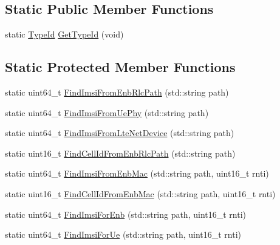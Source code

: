 \subsection*{Static Public Member Functions}
\begin{DoxyCompactItemize}
\item 
static \hyperlink{classns3_1_1TypeId}{Type\+Id} \hyperlink{classns3_1_1LteStatsCalculator_ab21178215156860d0f38cb3d1ae1991b}{Get\+Type\+Id} (void)
\end{DoxyCompactItemize}
\subsection*{Static Protected Member Functions}
\begin{DoxyCompactItemize}
\item 
static uint64\+\_\+t \hyperlink{classns3_1_1LteStatsCalculator_a1ed21b0ddc825f8d61a790083d098a76}{Find\+Imsi\+From\+Enb\+Rlc\+Path} (std\+::string path)
\item 
static uint64\+\_\+t \hyperlink{classns3_1_1LteStatsCalculator_a3b6ba2cfd900be948241a4838fb6a609}{Find\+Imsi\+From\+Ue\+Phy} (std\+::string path)
\item 
static uint64\+\_\+t \hyperlink{classns3_1_1LteStatsCalculator_a85843b5cea26f922818c1e3374a08e18}{Find\+Imsi\+From\+Lte\+Net\+Device} (std\+::string path)
\item 
static uint16\+\_\+t \hyperlink{classns3_1_1LteStatsCalculator_a5d4f64c0c48a8d0a841f0b889a11af2a}{Find\+Cell\+Id\+From\+Enb\+Rlc\+Path} (std\+::string path)
\item 
static uint64\+\_\+t \hyperlink{classns3_1_1LteStatsCalculator_a9cad885eb21450cedca3f94d6cf191d8}{Find\+Imsi\+From\+Enb\+Mac} (std\+::string path, uint16\+\_\+t rnti)
\item 
static uint16\+\_\+t \hyperlink{classns3_1_1LteStatsCalculator_a87a9bc9d89913c21ef67854abeaf2dd3}{Find\+Cell\+Id\+From\+Enb\+Mac} (std\+::string path, uint16\+\_\+t rnti)
\item 
static uint64\+\_\+t \hyperlink{classns3_1_1LteStatsCalculator_af6ffb642f9ef86076a53331e7aefdcb0}{Find\+Imsi\+For\+Enb} (std\+::string path, uint16\+\_\+t rnti)
\item 
static uint64\+\_\+t \hyperlink{classns3_1_1LteStatsCalculator_a1f46711b06f346117df8f77bcd4483a4}{Find\+Imsi\+For\+Ue} (std\+::string path, uint16\+\_\+t rnti)
\end{DoxyCompactItemize}
